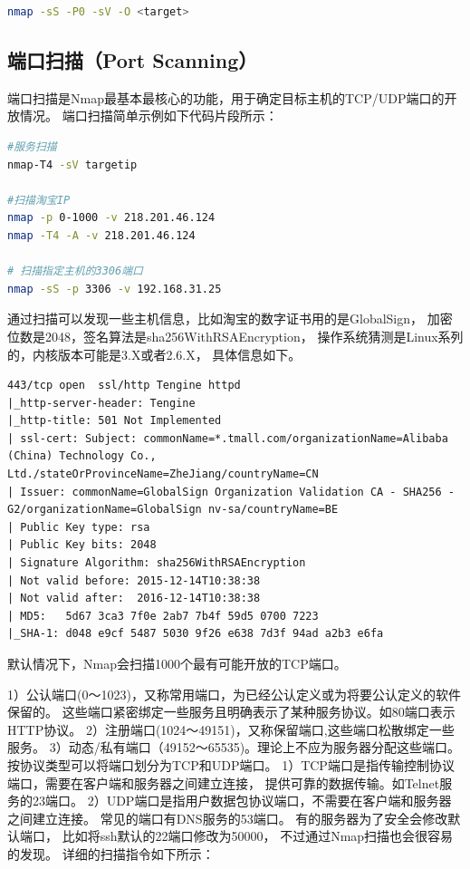 \documentclass[letter]{book}
\begin{document}
\begin{lstlisting}[language=Bash]
nmap -sS -P0 -sV -O <target>
\end{lstlisting}

\subsection{端口扫描（Port Scanning）}

端口扫描是Nmap最基本最核心的功能，用于确定目标主机的TCP/UDP端口的开放情况。
端口扫描简单示例如下代码片段所示：

\begin{lstlisting}[language=Bash]
#服务扫描
nmap-T4 -sV targetip 

#扫描淘宝IP
nmap -p 0-1000 -v 218.201.46.124
nmap -T4 -A -v 218.201.46.124

# 扫描指定主机的3306端口
nmap -sS -p 3306 -v 192.168.31.25
\end{lstlisting}

通过扫描可以发现一些主机信息，比如淘宝的数字证书用的是GlobalSign，
加密位数是2048，签名算法是sha256WithRSAEncryption，
操作系统猜测是Linux系列的，内核版本可能是3.X或者2.6.X，
具体信息如下。

\begin{lstlisting}
443/tcp open  ssl/http Tengine httpd
|_http-server-header: Tengine
|_http-title: 501 Not Implemented
| ssl-cert: Subject: commonName=*.tmall.com/organizationName=Alibaba (China) Technology Co., Ltd./stateOrProvinceName=ZheJiang/countryName=CN
| Issuer: commonName=GlobalSign Organization Validation CA - SHA256 - G2/organizationName=GlobalSign nv-sa/countryName=BE
| Public Key type: rsa
| Public Key bits: 2048
| Signature Algorithm: sha256WithRSAEncryption
| Not valid before: 2015-12-14T10:38:38
| Not valid after:  2016-12-14T10:38:38
| MD5:   5d67 3ca3 7f0e 2ab7 7b4f 59d5 0700 7223
|_SHA-1: d048 e9cf 5487 5030 9f26 e638 7d3f 94ad a2b3 e6fa
\end{lstlisting}

默认情况下，Nmap会扫描1000个最有可能开放的TCP端口。

1）公认端口(0～1023)，又称常用端口，为已经公认定义或为将要公认定义的软件保留的。
这些端口紧密绑定一些服务且明确表示了某种服务协议。如80端口表示HTTP协议。
2）注册端口(1024～49151)，又称保留端口,这些端口松散绑定一些服务。
3）动态/私有端口（49152～65535)。理论上不应为服务器分配这些端口。
按协议类型可以将端口划分为TCP和UDP端口。
1）TCP端口是指传输控制协议端口，需要在客户端和服务器之间建立连接，
提供可靠的数据传输。如Telnet服务的23端口。
2）UDP端口是指用户数据包协议端口，不需要在客户端和服务器之间建立连接。
常见的端口有DNS服务的53端口。
有的服务器为了安全会修改默认端口，
比如将ssh默认的22端口修改为50000，
不过通过Nmap扫描也会很容易的发现。
详细的扫描指令如下所示：
\end{document}
